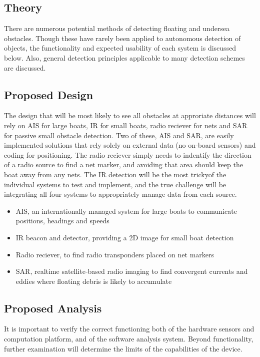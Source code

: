 \subsection{\label{sec:method:theory}Theory}
There are numerous potential methods of detecting floating and undersea obstacles. Though these have rarely been applied to autonomous detection of objects, the functionality and expected usability of each system is discussed below. Also, general detection principles applicable to many detection schemes are discussed.


\subsection{\label{sec:method:proposed-design}Proposed Design}
The design that will be most likely to see all obstacles at approriate distances will rely on AIS for large boats, IR for small boats, radio reciever for nets and SAR for passive small obstacle detection. Two of these, AIS and SAR, are easily implemented solutions that rely solely on external data (no on-board sensors) and coding for positioning. The radio reciever simply needs to indentify the direction of a radio source to find a net marker, and avoiding that area should keep the boat away from any nets. The IR detection will be the most trickyof the individual systems to test and implement, and the true challenge will be integrating all four systems to appropriately manage data from each source.


\begin{itemize}
\item AIS, an internationally managed system for large boats to communicate positions, headings and speeds
\item IR beacon and detector, providing a 2D image for small boat detection
\item Radio reciever, to find radio transponders placed on net markers
\item SAR, realtime satellite-based radio imaging to find convergent currents and eddies where floating debris is likely to accumulate
\end{itemize}



\subsection{\label{sec:method:proposed-analysis}Proposed Analysis}
It is important to verify the correct functioning both of the hardware sensors and computation platform, and of the software analysis system. Beyond functionality, further examination will determine the limits of the capabilities of the device.
